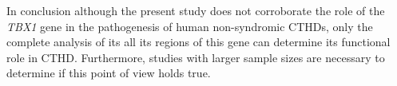 \begin{refsection}
In conclusion although the present study does not corroborate the role of the \textit{TBX1} gene in the pathogenesis of human non-syndromic CTHDs, only the complete analysis of its all its regions of this gene can determine its functional role in CTHD. Furthermore, studies with larger sample sizes are necessary to determine if this point of view holds true.


\clearpage

\printbibliography[heading=subbibintoc]
\end{refsection}